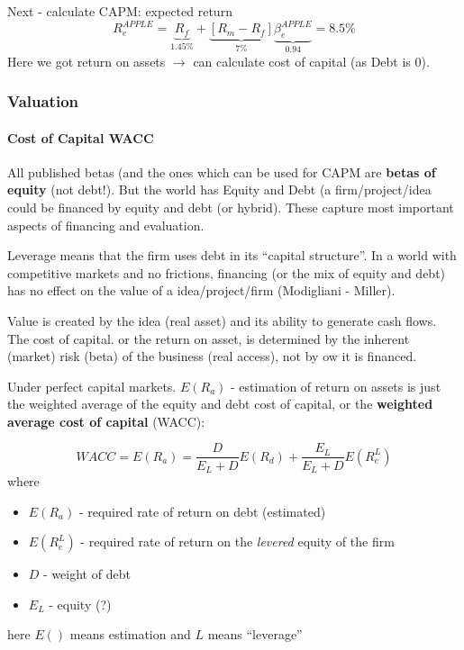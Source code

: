 \documentclass{scrartcl}
\begin{document}
Next - calculate CAPM: expected return 
$$R^{APPLE}_e = \underbrace{R_f}_{1.45\%} + \underbrace{[R_m - R_f]}_{7\%}
\underbrace{\beta_e^{APPLE}}_{0.94} = 8.5\%$$ 
Here we got return on assets $\to$ can calculate cost of capital (as Debt is 0).

\subsubsection{Valuation}
\label{sec:StockPricingValuation}

\paragraph{Cost of Capital WACC}

All published betas (and the ones which can be used for CAPM  are {\bf betas of
  equity} (not debt!). But the world has Equity and Debt (a firm/project/idea
could be financed by equity and debt (or hybrid). These capture most important
aspects of financing and evaluation.

Leverage means that the firm uses debt in its ``capital structure''. In a world
with competitive markets and no frictions, financing (or the mix of equity and
debt) has no effect on the value of a idea/project/firm (Modigliani - Miller). 

Value is created by the idea (real asset) and its ability to generate cash
flows. The cost of capital. or the return on asset, is determined by the
inherent (market) risk (beta) of the business (real access), not by ow it is
financed. 

Under perfect capital markets. $E(R_a)$ - estimation of return on assets is just
the weighted average of the equity and debt cost of capital, or the {\bf weighted
average cost of capital} (WACC):

$$WACC = E(R_a) = \frac{D}{E_L + D}E(R_d) + \frac{E_L}{E_L + D}E(R^L_e)$$
where
\begin{itemize}
\item $E(R_a)$ -  required rate of return on debt (estimated)
\item $E(R_e^L)$ - required rate of return on the {\it levered} equity of the
  firm
\item $D$ - weight of debt
\item $E_L$ - equity (?)
\end{itemize}
here $E()$ means estimation and $L$ means ``leverage'' 

\end{document}
